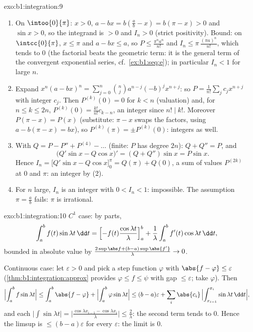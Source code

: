 \begin{solution}{exo:b1:integration:9}
\begin{enumerate}
  \item On $\intoo{0}{\pi}$: $x > 0$, $a - bx = b(\frac ab - x) =
        b(\pi - x) > 0$ and $\sin x > 0$, so the integrand is $> 0$
        and $I_n > 0$ (strict positivity). Bound: on
        $\intcc{0}{\pi}$, $x \leq \pi$ and $a - bx \leq a$, so $P
        \leq \frac{\pi^n a^n}{n!}$ and $I_n \leq
        \pi\,\frac{(\pi a)^n}{n!}$, which tends to $0$ (the
        factorial beats the geometric term: it is the general term
        of the convergent exponential series, cf.\
        \cref{ex:b1:seq:e}); in particular $I_n < 1$ for large $n$.
  \item Expand $x^n(a - bx)^n = \sum_{j=0}^{n} \binom nj a^{n-j}
        (-b)^j x^{n+j}$: so $P = \frac{1}{n!}\sum_j c_j x^{n+j}$
        with integer $c_j$. Then $P^{(k)}(0) = 0$ for $k < n$
        (valuation) and, for $n \leq k \leq 2n$, $P^{(k)}(0) =
        \frac{k!}{n!} c_{k-n}$, an integer since $n! \mid k!$.
        Moreover $P(\pi - x) = P(x)$ (substitute: $\pi - x$ swaps
        the factors, using $a - b(\pi - x) = bx$), so $P^{(k)}(\pi)
        = \pm P^{(k)}(0)$: integers as well.
  \item With $Q = P - P'' + P^{(4)} - \dots$ (finite: $P$ has degree
        $2n$): $Q + Q'' = P$, and
        \[
        \bigl(Q'\sin x - Q\cos x\bigr)' = (Q + Q'')\sin x = P\sin x .
        \]
        Hence $I_n = \bigl[Q'\sin x - Q\cos x\bigr]_0^{\pi} = Q(\pi)
        + Q(0)$, a sum of values $P^{(2k)}$ at $0$ and $\pi$: an
        integer by (2).
  \item For $n$ large, $I_n$ is an integer with $0 < I_n < 1$:
        impossible. The assumption $\pi = \frac ab$ fails: $\pi$ is
        irrational.
\end{enumerate}
\end{solution}

\begin{solution}{exo:b1:integration:10}
$C^1$ case: by parts,
\[
\int_a^b f(t)\sin\lambda t\,\dd t
= \Bigl[-f(t)\frac{\cos\lambda t}{\lambda}\Bigr]_a^b
+ \frac{1}{\lambda}\int_a^b f'(t)\cos\lambda t\,\dd t,
\]
bounded in absolute value by $\frac{2\sup\abs f + (b - a)\sup\abs{f'}}
{\lambda} \to 0$.

Continuous case: let $\varepsilon > 0$ and pick a step function
$\varphi$ with $\abs{f - \varphi} \leq \varepsilon$
(\cref{thm:b1:integration:approx} provides $\varphi \leq f \leq
\psi$ with gap $\leq\varepsilon$; take $\varphi$). Then
\[
\Bigl|\int_a^b f\sin\lambda t\Bigr|
\leq \int_a^b \abs{f - \varphi}
+ \Bigl|\int_a^b \varphi \sin\lambda t\Bigr|
\leq (b-a)\varepsilon
+ \sum_i \abs{c_i}\,\Bigl|\int_{x_{i-1}}^{x_i} \sin\lambda t\,\dd
t\Bigr| ,
\]
and each $\bigl|\int \sin \lambda t\bigr| = \bigl|\frac{\cos\lambda
x_{i-1} - \cos\lambda x_i}{\lambda}\bigr| \leq \frac{2}{\lambda}$:
the second term tends to $0$. Hence the limsup is $\leq
(b-a)\varepsilon$ for every $\varepsilon$: the limit is $0$.
\end{solution}


